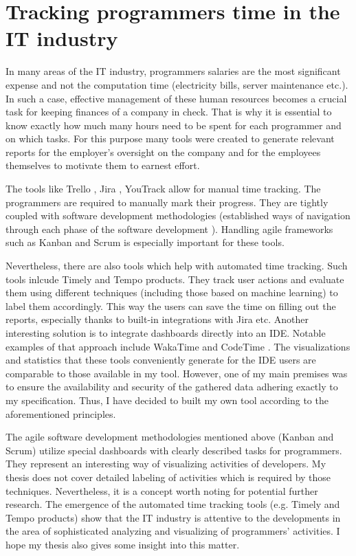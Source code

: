 \section{Tracking programmers time in the IT industry}

In many areas of the IT industry, programmers salaries are the most significant expense
and not the computation time (electricity bills, server maintenance etc.). In such a case, effective management of these human resources becomes a crucial task for keeping finances of a company in check. That is why it is essential to know exactly how much many hours need to be spent for each programmer and on which tasks. For this purpose many tools were created to generate relevant reports for the employer's oversight on the company and for the employees themselves to motivate them to earnest effort.

The tools like Trello \cite{Trello}, Jira \cite{Jira}, YouTrack \cite{YouTrack} allow for manual time tracking. The programmers are required to manually mark their progress. They are tightly coupled with software development methodologies (established ways of navigation through each phase of the software development \cite{Con92SDM}). Handling agile frameworks such as Kanban and Scrum is especially important for these tools.

Nevertheless, there are also tools which help with automated time tracking. Such tools inlcude Timely \cite{Timely} and Tempo \cite{Tempo} products. They track user actions and evaluate them using different techniques (including those based on machine learning) to label them accordingly. This way the users can save the time on filling out the reports, especially thanks to built-in integrations with Jira etc. Another interesting solution is to integrate dashboards directly into an IDE. Notable examples of that approach include WakaTime \cite{WakaTime} and CodeTime \cite{CodeTime}. The visualizations and statistics that these tools conveniently generate for the IDE users are comparable to those available in my tool. However, one of my main premises was to ensure the availability and security of the gathered data adhering exactly to my specification. Thus, I have decided to built my own tool according to the aforementioned principles.

The agile software development methodologies mentioned above (Kanban and Scrum) utilize special dashboards with clearly described tasks for programmers. They represent an interesting way of visualizing activities of developers. My thesis does not cover detailed labeling of activities which is required by those techniques. Nevertheless, it is a concept worth noting for potential further research. The emergence of the automated time tracking tools (e.g. Timely and Tempo products) show that the IT industry is attentive to the developments in the area of sophisticated analyzing and visualizing of programmers' activities. I hope my thesis also gives some insight into this matter.

